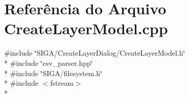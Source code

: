 \section{Referência do Arquivo Create\+Layer\+Model.\+cpp}
\label{_create_layer_model_8cpp}
{\ttfamily \#include \char`\"{}S\+I\+G\+A/\+Create\+Layer\+Dialog/\+Create\+Layer\+Model.\+h\char`\"{}}\\*
{\ttfamily \#include \char`\"{}csv\+\_\+parser.\+hpp\char`\"{}}\\*
{\ttfamily \#include \char`\"{}S\+I\+G\+A/filesystem.\+h\char`\"{}}\\*
{\ttfamily \#include $<$fstream$>$}\\*
